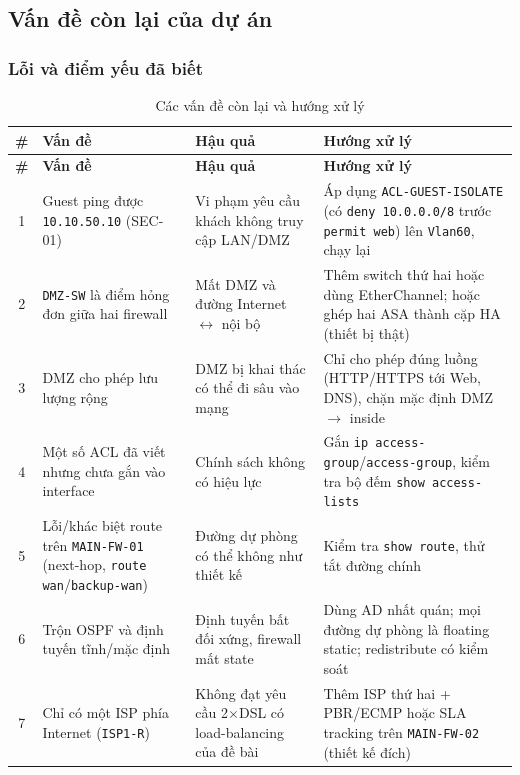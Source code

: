 \subsection{Vấn đề còn lại của dự án}

\subsubsection{Lỗi và điểm yếu đã biết}
\begin{small}
\setlength{\tabcolsep}{3pt}
\begin{longtable}{|c|p{4.3cm}|p{3.4cm}|p{5.0cm}|}
\caption{Các vấn đề còn lại và hướng xử lý} \label{tab:open_issues} \\
\hline
\textbf{\#} & \textbf{Vấn đề} & \textbf{Hậu quả} & \textbf{Hướng xử lý} \\ \hline
\endfirsthead
\hline \textbf{\#} & \textbf{Vấn đề} & \textbf{Hậu quả} & \textbf{Hướng xử lý} \\ \hline
\endhead
1 & Guest ping được \texttt{10.10.50.10} (SEC-01) & Vi phạm yêu cầu khách không truy cập LAN/DMZ & Áp dụng \texttt{ACL-GUEST-ISOLATE} (có \texttt{deny 10.0.0.0/8} trước \texttt{permit web}) lên \texttt{Vlan60}, chạy lại \\ \hline
2 & \texttt{DMZ-SW} là điểm hỏng đơn giữa hai firewall & Mất DMZ và đường Internet $\leftrightarrow$ nội bộ & Thêm switch thứ hai hoặc dùng EtherChannel; hoặc ghép hai ASA thành cặp HA (thiết bị thật) \\ \hline
3 & DMZ cho phép lưu lượng rộng & DMZ bị khai thác có thể đi sâu vào mạng & Chỉ cho phép đúng luồng (HTTP/HTTPS tới Web, DNS), chặn mặc định DMZ $\to$ inside \\ \hline
4 & Một số ACL đã viết nhưng chưa gắn vào interface & Chính sách không có hiệu lực & Gắn \texttt{ip access-group}/\texttt{access-group}, kiểm tra bộ đếm \texttt{show access-lists} \\ \hline
5 & Lỗi/khác biệt route trên \texttt{MAIN-FW-01} (next-hop, \texttt{route wan}/\texttt{backup-wan}) & Đường dự phòng có thể không như thiết kế & Kiểm tra \texttt{show route}, thử tắt đường chính \\ \hline
6 & Trộn OSPF và định tuyến tĩnh/mặc định & Định tuyến bất đối xứng, firewall mất state & Dùng AD nhất quán; mọi đường dự phòng là floating static; redistribute có kiểm soát \\ \hline
7 & Chỉ có một ISP phía Internet (\texttt{ISP1-R}) & Không đạt yêu cầu 2$\times$DSL có load-balancing của đề bài & Thêm ISP thứ hai + PBR/ECMP hoặc SLA tracking trên \texttt{MAIN-FW-02} (thiết kế đích) \\ \hline

\end{longtable}
\end{small}
